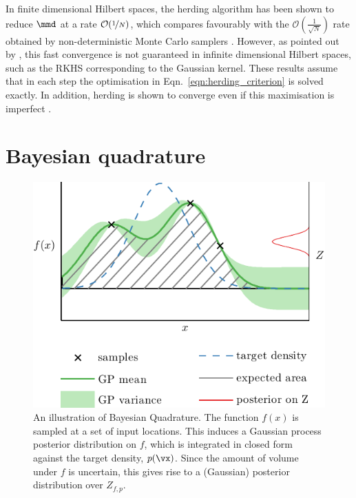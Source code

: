 In finite dimensional Hilbert spaces, the herding algorithm has been shown to reduce $\mmd$ at a rate $\mathcal{O}(\nicefrac{1}{N})$, which compares favourably with the $\mathcal{O}(\frac{1}{\sqrt{N}})$ rate obtained by non-deterministic Monte Carlo samplers \citep{chen2010super,bach2012equivalence}. However, as pointed out by \citep{bach2012equivalence}, this fast convergence is not guaranteed in infinite dimensional Hilbert spaces, such as the RKHS corresponding to the Gaussian kernel. These results assume that in each step the optimisation in Eqn.\ \ref{eqn:herding_criterion} is solved exactly. In addition, herding is shown to converge even if this maximisation is imperfect \citep{Gelfand2010}.


\section{Bayesian quadrature} 

\begin{figure}
\centering
\includegraphics[width=.8\columnwidth]{figs/herding/bq_intro4}
\caption[An illustration of Bayesian quadrature]{An illustration of Bayesian Quadrature. The function $f(x)$ is sampled at a set of input locations. This induces a Gaussian process posterior distribution on $f$, which is integrated in closed form against the target density, $p(\vx)$. Since the amount of volume under $f$ is uncertain, this gives rise to a (Gaussian) posterior distribution over $Z_{f,p}$.}
\label{fig:bq_intro}
\end{figure}

